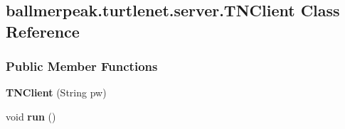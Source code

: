 \hypertarget{classballmerpeak_1_1turtlenet_1_1server_1_1TNClient}{\subsection{ballmerpeak.\-turtlenet.\-server.\-T\-N\-Client Class Reference}
\label{classballmerpeak_1_1turtlenet_1_1server_1_1TNClient}
}
\subsubsection*{Public Member Functions}
\begin{DoxyCompactItemize}
\item 
\hypertarget{classballmerpeak_1_1turtlenet_1_1server_1_1TNClient_ac4a0dada0133edeee842b9335c350454}{{\bfseries T\-N\-Client} (String pw)}\label{classballmerpeak_1_1turtlenet_1_1server_1_1TNClient_ac4a0dada0133edeee842b9335c350454}

\item 
\hypertarget{classballmerpeak_1_1turtlenet_1_1server_1_1TNClient_adc8a19a614bf011afa7ca0e2435de031}{void {\bfseries run} ()}\label{classballmerpeak_1_1turtlenet_1_1server_1_1TNClient_adc8a19a614bf011afa7ca0e2435de031}

\end{DoxyCompactItemize}
